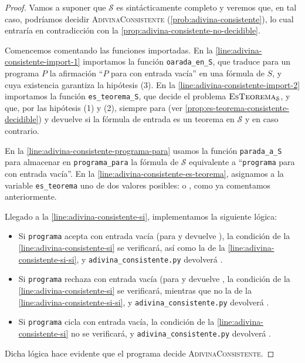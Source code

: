 \begin{proof}
Vamos a suponer que $\mathcal{S}$ es sintácticamente completo y veremos que, en tal caso, podríamos decidir \textsc{AdivinaConsistente} (\cref{prob:adivina-consistente}), lo cual entraría en contradicción con la \cref{prop:adivina-consistente-no-decidible}.

Comencemos comentando las funciones importadas. En la \cref{line:adivina-consistente-import-1} importamos la función \texttt{oarada\_en\_S}, que traduce para un programa $P$ la afirmación ``$P$ para con entrada vacía'' en una fórmula de $\mathcal{}S$, y cuya existencia garantiza la hipótesis (3). En la \cref{line:adivina-consistente-import-2} importamos la función \texttt{es\_teorema\_S}, que decide el problema $\textsc{EsTeorema}_\mathcal{S}$, y que, por las hipótesis (1) y (2), siempre para (ver \cref{prop:es-teorema-consistente-decidible}) y devuelve  si la fórmula de entrada es un teorema en $\mathcal{S}$ y  en caso contrario.

En la \cref{line:adivina-consistente-programa-para} usamos la función \texttt{parada\_a\_S} para almacenar en \texttt{programa\_para} la fórmula de $\mathcal{S}$ equivalente a ``\texttt{programa} para con entrada vacía''. En la \cref{line:adivina-consistente-es-teorema}, asignamos a la variable \texttt{es\_teorema} uno de dos valores posibles:  o , como ya comentamos anteriormente.

Llegado a la \cref{line:adivina-consistente-si}, implementamos la siguiente lógica:
\begin{itemize}
    \item Si \texttt{programa} acepta con entrada vacía (para y devuelve ), la condición de la \cref{line:adivina-consistente-si} se verificará, así como la de la \cref{line:adivina-consistente-si-si}, y \texttt{adivina\_consistente.py} devolverá .
    \item Si \texttt{programa} rechaza con entrada vacía (para y devuelve , la condición de la \cref{line:adivina-consistente-si} se verificará, mientras que no la de la \cref{line:adivina-consistente-si-si}, y \texttt{adivina\_consistente.py} devolverá .
    \item Si \texttt{programa} cicla con entrada vacía, la condición de la \cref{line:adivina-consistente-si} no se verificará, y \texttt{adivina\_consistente.py} devolverá .
\end{itemize}
Dicha lógica hace evidente que el programa decide \textsc{AdivinaConsistente}.
\end{proof}

